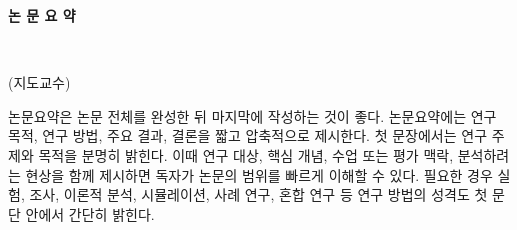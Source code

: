 \begingroup
\thispagestyle{plain}

\begin{center}
\vspace*{10mm}

{\fontsize{14pt}{22.4pt}\selectfont \textbf{논 문 요 약}\par}

\vspace{10mm}
{\fontsize{16pt}{21.33pt}\selectfont \thesistitleKor\par}

\vspace{10mm}
{\fontsize{13pt}{20.8pt}\selectfont \SpacedAuthorName{\authorKor}\par}

\vspace{10mm}
{\fontsize{13pt}{20.8pt}\selectfont \universityKor\ \majorKor\par}
{\fontsize{13pt}{20.8pt}\selectfont (지도교수\hspace{2em}\SpacedAuthorName{\advisorKor})\par}
\vspace{15mm}
\end{center}

\begingroup
{}
\normalfont\normalsize\selectfont

\noindent
논문요약은 논문 전체를 완성한 뒤 마지막에 작성하는 것이 좋다.
논문요약에는 연구 목적, 연구 방법, 주요 결과, 결론을 짧고 압축적으로 제시한다.
첫 문장에서는 연구 주제와 목적을 분명히 밝힌다.
이때 연구 대상, 핵심 개념, 수업 또는 평가 맥락, 분석하려는 현상을 함께 제시하면 독자가 논문의 범위를 빠르게 이해할 수 있다.
필요한 경우 실험, 조사, 이론적 분석, 시뮬레이션, 사례 연구, 혼합 연구 등 연구 방법의 성격도 첫 문단 안에서 간단히 밝힌다.

